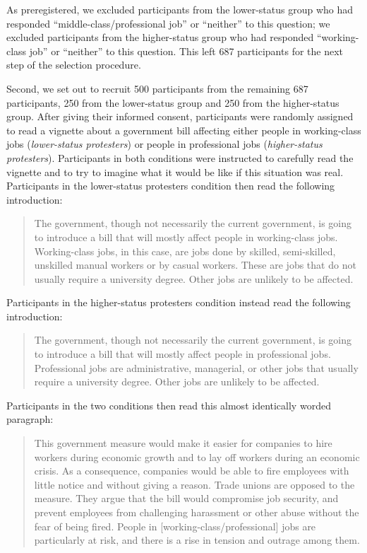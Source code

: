 \documentclass[12pt, letterpaper]{article}
\begin{document}
\noindent As preregistered, we excluded participants from the
lower-status group who had responded ``middle-class/professional job''
or ``neither'' to this question; we excluded participants from the
higher-status group who had responded ``working-class job'' or
``neither'' to this question. This left 687 participants for the next
step of the selection procedure.

Second, we set out to recruit 500 participants from the remaining 687
participants, 250 from the lower-status group and 250 from the
higher-status group. After giving their informed consent, participants
were randomly assigned to read a vignette about a government bill
affecting either people in working-class jobs (\emph{lower-status
protesters}) or people in professional jobs (\emph{higher-status
protesters}). Participants in both conditions were instructed to
carefully read the vignette and to try to imagine what it would be like
if this situation was real. Participants in the lower-status protesters
condition then read the following introduction:

\begin{quote}
The government, though not necessarily the current government, is going
to introduce a bill that will mostly affect people in working-class
jobs. Working-class jobs, in this case, are jobs done by skilled,
semi-skilled, unskilled manual workers or by casual workers. These are
jobs that do not usually require a university degree. Other jobs are
unlikely to be affected.
\end{quote}

\noindent Participants in the higher-status protesters condition instead
read the following introduction:

\begin{quote}
The government, though not necessarily the current government, is going
to introduce a bill that will mostly affect people in professional jobs.
Professional jobs are administrative, managerial, or other jobs that
usually require a university degree. Other jobs are unlikely to be
affected.
\end{quote}

\noindent Participants in the two conditions then read this almost
identically worded paragraph:

\begin{quote}
This government measure would make it easier for companies to hire
workers during economic growth and to lay off workers during an economic
crisis. As a consequence, companies would be able to fire employees with
little notice and without giving a reason. Trade unions are opposed to
the measure. They argue that the bill would compromise job security, and
prevent employees from challenging harassment or other abuse without the
fear of being fired. People in {[}working-class/professional{]} jobs are
particularly at risk, and there is a rise in tension and outrage among
them.
\end{quote}
\end{document}
